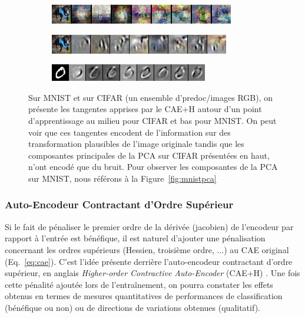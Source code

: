 \begin{figure}
\centering
\begin{subfigure}{0.9\linewidth}
\includegraphics[width=0.9\linewidth]{predoc/images/pca.png}
\label{fig:tan_pca}
\end{subfigure}

\begin{subfigure}{0.9\linewidth}
\includegraphics[width=0.9\linewidth]{predoc/images/tangents_cifar.png}
\label{fig:tan_cifar}
\end{subfigure}

\begin{subfigure}{0.9\linewidth}
\includegraphics[width=0.9\linewidth]{predoc/images/tangents_mnist.png}
\label{fig:tan_mnist}
\end{subfigure}


   \caption{ Sur MNIST et sur CIFAR (un ensemble d'predoc/images RGB), on présente les
   tangentes apprises par le CAE+H autour d'un point d'apprentissage au milieu pour CIFAR et bas pour MNIST. On peut voir que ces
   tangentes encodent de l'information sur des transformation plausibles de
   l'image originale tandis que les composantes principales de la PCA sur CIFAR présentées en haut, n'ont
   encodé que du bruit. Pour observer les composantes de la PCA sur MNIST, nous référons à la Figure~\ref{fig:mnistpca}
\label{fig:tan}}

\end{figure}

\subsubsection{Auto-Encodeur Contractant d'Ordre Supérieur}

Si le fait de pénaliser le premier ordre de la dérivée (jacobien) de l'encodeur
par rapport à l'entrée est bénéfique, il est naturel d'ajouter une pénalisation
concernant les ordres supérieurs (Hessien, troisième ordre, ...) au CAE
original (Eq.~\ref{eq:cae}).  C'est l'idée présente derrière l'auto-encodeur
contractant d'ordre supérieur, en anglais \textit{Higher-order Contractive
Auto-Encoder} (CAE+H) \citep{Salah+al-2011}.  Une fois cette pénalité ajoutée
lors de l'entraînement, on pourra constater les effets obtenus en termes de
mesures quantitatives de performances de classification (bénéfique ou non) ou
de directions de variations obtenues (qualitatif).

